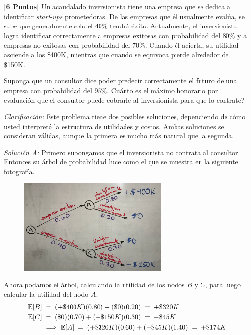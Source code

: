 \documentclass[ a4paper, twoside, 11pt]{article}
\begin{document}
\begin{problem}
\textbf{[6 Puntos]} Un acaudalado inversionista tiene una empresa que se dedica a identificar \emph{start-ups} prometedoras. De las empresas que \'el usualmente eval\'ua, se sabe que generalmente solo el 40\% tendr\'a \'exito. Actualmente, el inversionista logra identificar correctamente a empresas exitosas con probabilidad del 80\% y a empresas no-exitosas con probabilidad del 70\%. Cuando \'el acierta, su utilidad asciende a los \$400K, mientras que cuando se equivoca pierde alrededor de \$150K. 

Suponga que un consultor dice poder predecir correctamente el futuro de una empresa con probabilidad del 95\%. Cu\'anto es el m\'aximo honorario por evaluaci\'on que el consultor puede cobrarle al inversionista para que lo contrate? 

\emph{Clarificaci\'on:} Este problema tiene dos posibles soluciones, dependiendo de c\'omo usted interpret\'o la estructura de utilidades y costos. Ambas soluciones se consideran v\'alidas, aunque la primera es mucho m\'as natural que la segunda. 

\emph{Soluci\'on A:} Primero supongamos que el inversionista no contrata al consultor. Entonces su \'arbol de probabilidad luce como el que se muestra en la siguiente fotograf\'ia. 
\begin{figure}[H]
\centering
\includegraphics[width=0.66\textwidth]{Problema-3A1.jpg}
\end{figure}
Ahora podamos el \'arbol, calculando la utilidad de los nodos $B$ y $C$, para luego calcular la utilidad del nodo $A$. 
\begin{align*}
\mathbb{E}[B] \; 
& = \; (+\$400K)(0.80) + (\$0)(0.20) \; = \; +\$320K \\
\mathbb{E}[C] \; 
& = \; (\$0)(0.70) + (-\$150K)(0.30) \; = \; -\$45K \\
& \Longrightarrow \; \mathbb{E}[A] \; = \;
(+\$320K)(0.60) + (-\$45K)(0.40) \; = \; +\$174K
\end{align*}


\end{problem}
\end{document}
